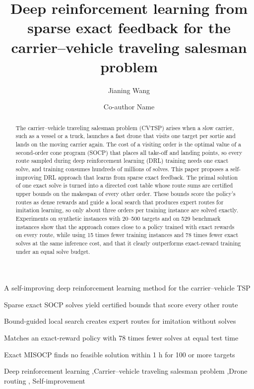 \documentclass[preprint,review,12pt,authoryear]{elsarticle}
\begin{document}
\begin{frontmatter}

\title{Deep reinforcement learning from sparse exact feedback for the carrier--vehicle traveling
salesman problem}

\author[a]{Jianing Wang}
\author[a]{Co-author Name}

\begin{abstract}
The carrier--vehicle traveling salesman problem (CVTSP) arises when a slow carrier, such as a vessel or a
truck, launches a fast drone that visits one target per sortie and lands on the moving carrier again. The
cost of a visiting order is the optimal value of a second-order cone program (SOCP) that places all take-off
and landing points, so every route sampled during deep reinforcement learning (DRL) training needs one exact
solve, and training consumes hundreds of millions of solves. This paper proposes a self-improving DRL
approach that learns from sparse exact feedback. The primal solution of one exact solve is turned into a
directed cost table whose route sums are certified upper bounds on the makespan of every other order. These
bounds score the policy's routes as dense rewards and guide a local search that produces expert routes for
imitation learning, so only about three orders per training instance are solved exactly. Experiments on
synthetic instances with 20--500 targets and on 529 benchmark instances show that the approach comes close
to a policy trained with exact rewards on every route, while using 15 times fewer training instances and 78
times fewer exact solves at the same inference cost, and that it clearly outperforms exact-reward training
under an equal solve budget.
\end{abstract}

\begin{highlights}
\item A self-improving deep reinforcement learning method for the carrier--vehicle TSP
\item Sparse exact SOCP solves yield certified bounds that score every other route
\item Bound-guided local search creates expert routes for imitation without solves
\item Matches an exact-reward policy with 78 times fewer solves at equal test time
\item Exact MISOCP finds no feasible solution within 1 h for 100 or more targets
\end{highlights}

\begin{keyword}
Deep reinforcement learning \sep Carrier--vehicle traveling salesman problem \sep Drone routing \sep
Self-improvement
\end{keyword}

\end{frontmatter}
\end{document}
